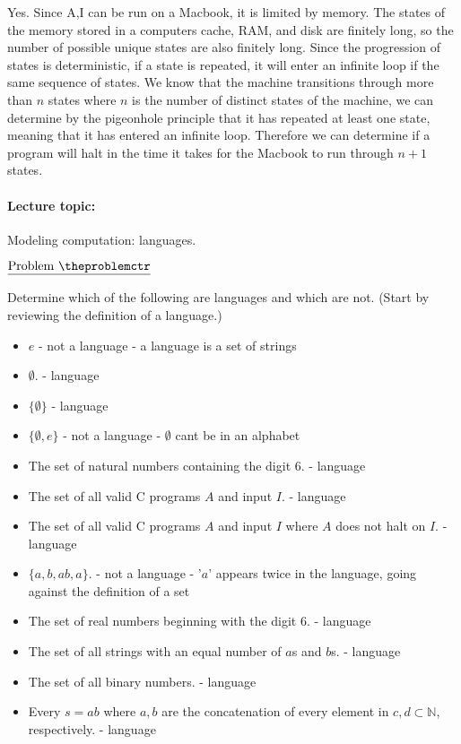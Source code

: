 \documentclass[11pt]{article}
\def\pp{\par\noindent}
\begin{document}
Yes. Since A,I can be run on a Macbook, it is limited by memory. The states of the memory stored in a computers cache, RAM, and disk are finitely long, so the number of possible unique states are also finitely long. Since the progression of states is deterministic, if a state is repeated, it will enter an infinite loop if the same sequence of states. We know that the machine transitions through more than $n$ states where $n$ is the number of distinct states of the machine, we can determine by the pigeonhole principle that it has repeated at least one state, meaning that it has entered an infinite loop. Therefore we can determine if a program will halt in the time it takes for the Macbook to run through $n+1$ states.


\paragraph{Lecture topic: }  Modeling computation: languages.

\addtocounter{problemctr}{1}
\bigskip
\noindent
$\underline{\rm Problem\ \theproblemctr}$\pp

\noindent
Determine which of the following are languages and which are not. (Start by reviewing the definition of a language.)


\begin{itemize}[noitemsep]
\item  $e$ - not a language - a language is a set of strings
\item $\emptyset$. - language
\item $\{\emptyset\}$ - language
\item $\{\emptyset,e \}$ - not a language - $\emptyset$ cant be in an alphabet
\item The set of natural numbers containing the digit 6. - language
\item The set of all valid C programs $A$ and input $I$. - language
\item The set of all valid C programs $A$ and input $I$ where $A$ does not halt on $I$. - language
\item $\{ a, b, ab, a \}$. - not a language - '$a$' appears twice in the language, going against the definition of a set
\item The set of real numbers beginning with the digit 6. - language
\item The set of all strings with an equal number of $a$s and $b$s. - language
\item The set of all binary numbers. - language
\item Every $s = ab$ where $a,b$ are the concatenation of every element in $c,d \subset \mathbb{N}$, respectively. - language
\end{itemize}
\end{document}
